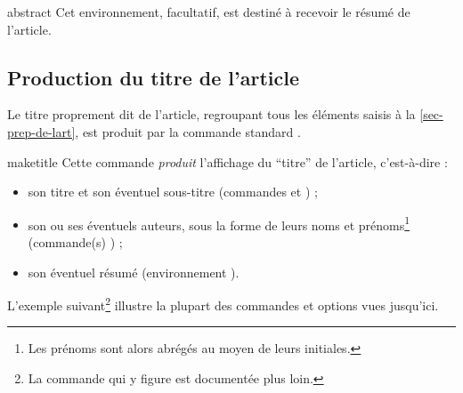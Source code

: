 \begin{docEnvironment}[doclang/environment content=résumé]{abstract}{}
  Cet environnement, facultatif, est destiné à recevoir le résumé de l'article.
\end{docEnvironment}

\subsection{Production du titre de l'article}
\label{sec-creation-du-titre}

Le titre proprement dit de l'article, regroupant tous les éléments saisis à la
\vref{sec-prep-de-lart}, est produit par la commande standard
.

\begin{docCommand}[doc description=\mandatory]{maketitle}{}
  Cette commande \emph{produit} l'affichage du \enquote{titre} de l'article,
  c'est-à-dire :
  \begin{itemize}
  \item son titre et son éventuel sous-titre (commandes  et
    ) ;
  \item son ou ses éventuels auteurs, sous la forme de leurs noms et
    prénoms\footnote{Les prénoms sont alors abrégés au moyen de leurs
      initiales.} (commande(s) ) ;
  \item son éventuel résumé (environnement ).
  \end{itemize}
\end{docCommand}

L'exemple suivant\footnote{La commande  qui y figure est
  documentée plus loin.} illustre la plupart des commandes et options vues
jusqu'ici.

